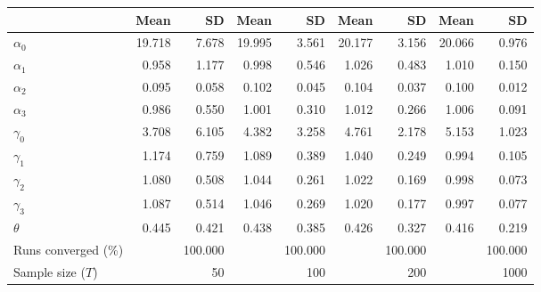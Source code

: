 
\begin{tabular}[t]{lrrrrrrrr}
\toprule
  & Mean & SD & Mean  & SD  & Mean   & SD   & Mean    & SD   \\
\midrule
$\alpha_{0}$ & 19.718 & 7.678 & 19.995 & 3.561 & 20.177 & 3.156 & 20.066 & 0.976\\
$\alpha_{1}$ & 0.958 & 1.177 & 0.998 & 0.546 & 1.026 & 0.483 & 1.010 & 0.150\\
$\alpha_{2}$ & 0.095 & 0.058 & 0.102 & 0.045 & 0.104 & 0.037 & 0.100 & 0.012\\
$\alpha_{3}$ & 0.986 & 0.550 & 1.001 & 0.310 & 1.012 & 0.266 & 1.006 & 0.091\\
$\gamma_{0}$ & 3.708 & 6.105 & 4.382 & 3.258 & 4.761 & 2.178 & 5.153 & 1.023\\
$\gamma_{1}$ & 1.174 & 0.759 & 1.089 & 0.389 & 1.040 & 0.249 & 0.994 & 0.105\\
$\gamma_{2}$ & 1.080 & 0.508 & 1.044 & 0.261 & 1.022 & 0.169 & 0.998 & 0.073\\
$\gamma_{3}$ & 1.087 & 0.514 & 1.046 & 0.269 & 1.020 & 0.177 & 0.997 & 0.077\\
$\theta$ & 0.445 & 0.421 & 0.438 & 0.385 & 0.426 & 0.327 & 0.416 & 0.219\\
Runs converged (\%) &  & 100.000 &  & 100.000 &  & 100.000 &  & 100.000\\
Sample size ($T$) &  & 50 &  & 100 &  & 200 &  & 1000\\
\bottomrule
\end{tabular}
